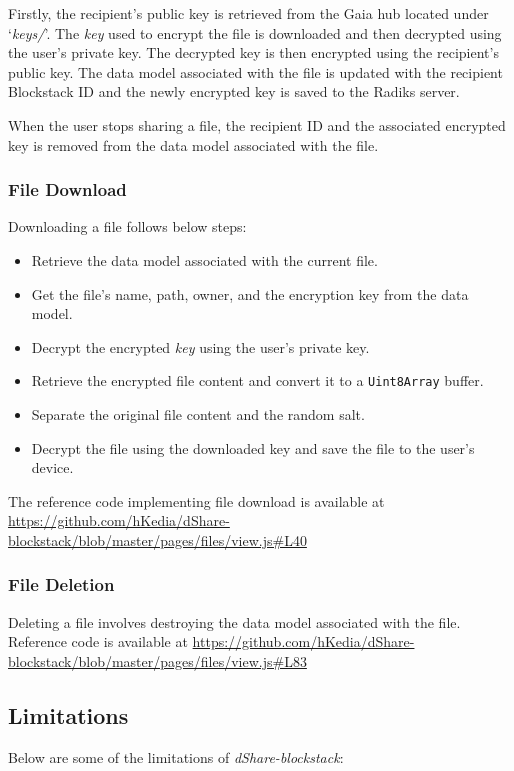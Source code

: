Firstly, the recipient's public key is retrieved from the Gaia hub located under `\textit{keys/}'. The \textit{key} used to encrypt the file is downloaded and then decrypted using the user's private key. The decrypted key is then encrypted using the recipient's public key. The data model associated with the file is updated with the recipient Blockstack ID and the newly encrypted key is saved to the Radiks server. 

When the user stops sharing a file, the recipient ID and the associated encrypted key is removed from the data model associated with the file.

\subsubsection{File Download}
Downloading a file follows below steps:

\begin{itemize}
	\item Retrieve the data model associated with the current file.
	\item Get the file's name, path, owner, and the encryption key from the data model.
	\item Decrypt the encrypted \textit{key} using the user's private key.
	\item Retrieve the encrypted file content and convert it to a \texttt{Uint8Array} buffer.
	\item Separate the original file content and the random salt.
	\item Decrypt the file using the downloaded key and save the file to the user's device.
\end{itemize}

The reference code implementing file download is available at \url{https://github.com/hKedia/dShare-blockstack/blob/master/pages/files/view.js#L40}

\subsubsection{File Deletion}
Deleting a file involves destroying the data model associated with the file. Reference code is available at \url{https://github.com/hKedia/dShare-blockstack/blob/master/pages/files/view.js#L83}

\subsection{Limitations}
Below are some of the limitations of \textit{dShare-blockstack}:

